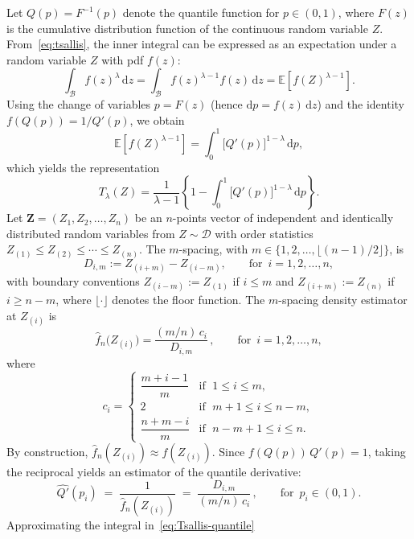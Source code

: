 \documentclass[
  lettersize  journal,
]{IEEEtran}%
\begin{document}
Let \(Q(p)=F^{-1}(p)\) denote the quantile function for \(p\in(0,1)\),
where \(F(z)\) is the cumulative distribution function of the continuous
random variable \(Z\). From~\eqref{eq:tsallis}, the inner integral can
be expressed as an expectation under a random variable \(Z\) with pdf
\(f(z)\): \[
\int_{\mathcal B} f(z)^\lambda\,\mathrm{d}z
=\int_{\mathcal B} f(z)^{\lambda-1} f(z)\,\mathrm{d}z
=\mathbb{E}\!\left[f(Z)^{\lambda-1}\right].
\] Using the change of variables \(p=F(z)\) (hence
\(\mathrm{d}p=f(z)\,\mathrm{d}z\)) and the identity \(f(Q(p))=1/Q'(p)\),
we obtain \[
  \mathbb{E}\!\left[f(Z)^{\lambda-1}\right]
  = \int_{0}^{1} \bigl[Q'(p)\bigr]^{1-\lambda}\,\mathrm{d}p,
\] which yields the representation \begin{equation}
  T_\lambda(Z)
  =\frac{1}{\lambda-1}
     \left\{
       1-\int_{0}^{1}\bigl[Q'(p)\bigr]^{1-\lambda}\,\mathrm{d}p
     \right\}.
  \label{eq:Tsallis-quantile}
\end{equation} Let \(\bm{Z}=(Z_1,Z_2,\dots,Z_n)\) be an \(n\)-points
vector of independent and identically distributed random variables from
\(Z\sim \mathcal{D}\) with order statistics
\(Z_{(1)}\le Z_{(2)} \le \cdots\le Z_{(n)}\). The \(m\)-spacing, with
\(m\in\{1,2,\dots,\lfloor (n-1)/2\rfloor\}\), is \[
D_{i,m}:=Z_{(i+m)}-Z_{(i-m)},\qquad \text{for }\, i=1,2,\dots,n,
\] with boundary conventions \(Z_{(i-m)}:=Z_{(1)}\) if \(i\le m\) and
\(Z_{(i+m)}:=Z_{(n)}\) if \(i\ge n-m\), where \(\lfloor \cdot \rfloor\)
denotes the floor function. The \(m\)-spacing density estimator at
\(Z_{(i)}\) is \begin{equation}
\widehat f_n\bigl(Z_{(i)}\bigr)
=\frac{(m/n) \, c_i}{D_{i,m}}\,,\qquad \text{for } \,i=1,2,\dots,n,
\label{eq:density-spacing}
\end{equation} where \[
c_i=
\begin{cases}
\dfrac{m+i-1}{m} & \text{if } \; 1\le i\le m,\\[6pt]
2 & \text{if } \; m+1\le i\le n-m,\\[6pt]
\dfrac{n+m-i}{m} & \text{if } \; n-m+1\le i\le n.
\end{cases}
\] By construction, \(\widehat f_n(Z_{(i)})\approx f(Z_{(i)})\). Since
\(f(Q(p))\,Q'(p)=1\), taking the reciprocal yields an estimator of the
quantile derivative: \begin{equation}
\widehat{Q'}(p_i)
\;=\; \frac{1}{\widehat f_n(Z_{(i)})}
\;=\; \frac{D_{i,m}}{(m/n)\, c_i}\,,
\qquad \text{for } \, p_i \in (0,1).
\label{eq:Qprime-hat}
\end{equation} Approximating the integral in~\eqref{eq:Tsallis-quantile}
\end{document}
